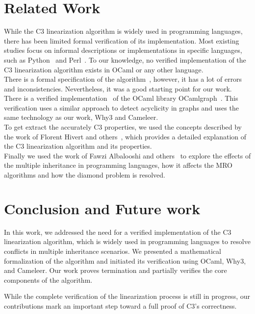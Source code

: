 \documentclass[runningheads]{llncs}
\begin{document}
\section{Related Work}
\label{sec:related-work}
While the C3 linearization algorithm is widely used in programming languages, 
there has been limited formal verification of its implementation.
Most existing studies focus on informal descriptions or implementations in specific languages, such as Python~\autocite{Python23Method} and Perl~\autocite{MroMethodResolution}.
To our knowledge, no verified implementation of the C3 linearization algorithm exists in OCaml or any other language.\\
There is a formal specification of the algorithm~\autocite{reisSoliderSolidity2023}, however, it has a lot of errors and inconsistencies. Nevertheless, it was a good starting point for our work.\\
There is a verified implementation~\autocite{castanhoAutoactiveVerificationGraph2022} of the OCaml library OCamlgraph~\autocite{filliatreBacktrackingOcamlgraph2025}. 
This verification uses a similar approach to detect acyclicity in graphs and uses the same technology as our work, Why3 and Cameleer.\\
To get extract the accurately C3 properties, we used the concepts described by the work of Florent Hivert and  others~\autocite{hivertControllingC3Super2024}, which provides a detailed explanation of the C3 linearization algorithm and its properties.\\
Finally we used the work of Fawzi Albalooshi and others~\autocite{albalooshiComparativeStudyEffect2017} to explore the effects of the multiple inheritance in programming languages, how it affects the MRO algorithms and how the diamond problem is resolved.

\section{Conclusion and Future work}
\label{sec:conclusion-future}
In this work, we addressed the need for a verified implementation of the C3 linearization algorithm, which is widely used in programming languages to resolve conflicts in multiple inheritance scenarios. 
We presented a mathematical formalization of the algorithm and initiated its verification using OCaml, Why3, and Cameleer. Our work proves termination and partially verifies the core components of the algorithm.

While the complete verification of the linearization process is still in progress, our contributions mark an important step toward a full proof of C3's correctness.
\end{document}
